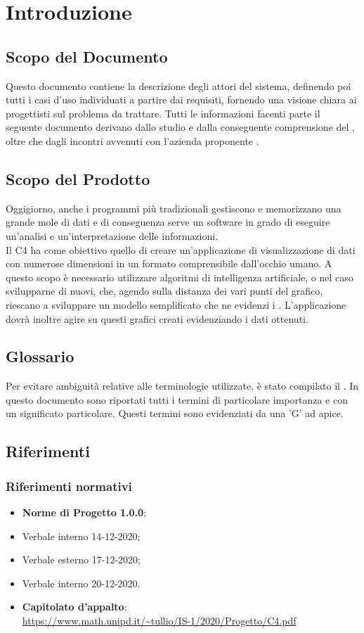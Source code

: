 \section{Introduzione}
\subsection{Scopo del Documento}
Questo documento contiene la descrizione degli attori del sistema, definendo poi tutti i casi d'uso individuati a partire dai requisiti, fornendo una visione chiara ai progettisti sul problema da trattare. Tutti le informazioni facenti parte il seguente documento derivano dallo studio e dalla conseguente comprensione del , oltre che dagli incontri avvenuti con l'azienda proponente \Proponente{}.
\subsection{Scopo del Prodotto}
Oggigiorno, anche i programmi più tradizionali gestiscono e memorizzano una grande mole di dati e di conseguenza serve un software in grado di eseguire un'analisi e un'interpretazione delle informazioni.\\
Il  C4 ha come obiettivo quello di creare un'applicazione di visualizzazione di dati con numerose dimensioni in un formato comprensibile dall'occhio umano.  A questo scopo è necessario utilizzare algoritmi di intelligenza artificiale, o nel caso svilupparne di nuovi, che, agendo sulla distanza dei vari punti del grafico, riescano a sviluppare un modello semplificato che ne evidenzi i . 
L'applicazione dovrà inoltre agire su questi grafici creati evidenziando i dati ottenuti.
\subsection{Glossario}
Per evitare ambiguità relative alle terminologie utilizzate, è stato compilato il . In questo documento sono riportati tutti i termini di particolare importanza e con un significato particolare. Questi termini sono evidenziati da una 'G' ad apice.
\subsection{Riferimenti}
\subsubsection{Riferimenti normativi}
\begin{itemize}
	\item \textbf{Norme di Progetto 1.0.0};
	\item Verbale interno 14-12-2020;
	\item Verbale esterno 17-12-2020;
	\item Verbale interno 20-12-2020.
	\item \textbf{Capitolato d'appalto}:\\
	\textcolor{blue}{\url{https://www.math.unipd.it/~tullio/IS-1/2020/Progetto/C4.pdf}}
\end{itemize}

